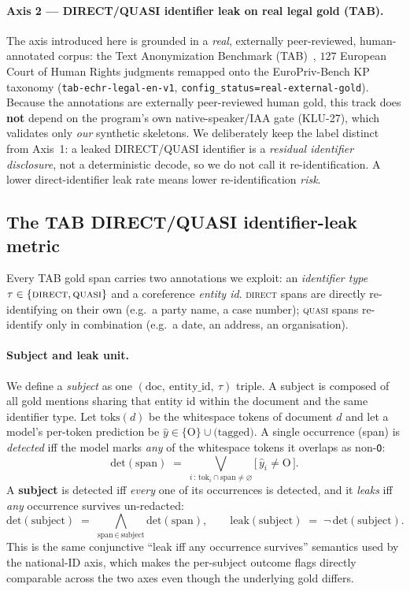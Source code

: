 \documentclass[11pt]{article}
\begin{document}
\paragraph{Axis 2 --- DIRECT/QUASI identifier leak on real legal gold (TAB).}
The axis introduced here is grounded in a \emph{real}, externally peer-reviewed,
human-annotated corpus: the Text Anonymization Benchmark
(TAB)~\cite{pilan2022tab}, $127$ European Court of Human Rights judgments remapped onto
the EuroPriv-Bench KP taxonomy (\texttt{tab-echr-legal-en-v1},
\texttt{config\_status=real-external-gold}). Because the annotations are externally
peer-reviewed human gold, this track does \textbf{not} depend on the program's own
native-speaker/IAA gate (KLU-27), which validates only \emph{our} synthetic skeletons.
We deliberately keep the label distinct from Axis~1: a leaked DIRECT/QUASI identifier is
a \emph{residual identifier disclosure}, not a deterministic decode, so we do not call it
re-identification. A lower direct-identifier leak rate means lower re-identification \emph{risk}.

\subsection{The TAB DIRECT/QUASI identifier-leak metric}
\label{subsec:tab-metric}
Every TAB gold span carries two annotations we exploit: an \emph{identifier type}
$\tau \in \{\textsc{direct}, \textsc{quasi}\}$ and a coreference \emph{entity id}.
\textsc{direct} spans are directly re-identifying on their own (e.g.\ a party name, a
case number); \textsc{quasi} spans re-identify only in combination (e.g.\ a date, an
address, an organisation).

\paragraph{Subject and leak unit.}
We define a \emph{subject} as one $(\text{doc},\ \text{entity\_id},\ \tau)$ triple. A
subject is composed of all gold mentions sharing that entity id within the document and
the same identifier type. Let $\mathrm{toks}(d)$ be the whitespace tokens of document
$d$ and let a model's per-token prediction be $\hat{y} \in \{\text{O}\} \cup
\text{(tagged)}$. A single occurrence (span) is \emph{detected} iff the model marks
\emph{any} of the whitespace tokens it overlaps as non-\texttt{O}:
\[
  \mathrm{det}(\text{span}) \;=\; \bigvee_{i\,:\, \mathrm{tok}_i \cap \text{span}\neq\varnothing}
  \big[\,\hat{y}_i \neq \text{O}\,\big].
\]
A \textbf{subject} is detected iff \emph{every} one of its occurrences is detected, and it
\emph{leaks} iff \emph{any} occurrence survives un-redacted:
\[
  \mathrm{det}(\text{subject}) \;=\; \bigwedge_{\text{span}\,\in\,\text{subject}}
  \mathrm{det}(\text{span}),
  \qquad
  \mathrm{leak}(\text{subject}) \;=\; \neg\,\mathrm{det}(\text{subject}).
\]
This is the same conjunctive ``leak iff any occurrence survives'' semantics used by the
national-ID axis, which makes the per-subject outcome flags directly comparable across the
two axes even though the underlying gold differs.
\end{document}
